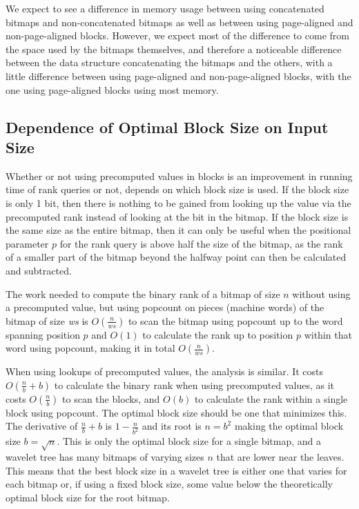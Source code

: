We expect to see a difference in memory usage between using concatenated bitmaps and non-concatenated bitmaps as well as between using page-aligned and non-page-aligned blocks.
However, we expect most of the difference to come from the space used by the bitmaps themselves, and therefore a noticeable difference between the data structure concatenating the bitmaps and the others, with a little difference between using page-aligned and non-page-aligned blocks, with the one using page-aligned blocks using most memory.


\subsection{Dependence of Optimal Block Size on Input Size}
\label{sec:bDependOnN}
Whether or not using precomputed values in blocks is an improvement in running time of rank queries or not, depends on which block size is used.
If the block size is only 1 bit, then there is nothing to be gained from looking up the value via the precomputed rank instead of looking at the bit in the bitmap.
If the block size is the same size as the entire bitmap, then it can only be useful when the positional parameter $p$ for the rank query is above half the size of the bitmap, as the rank of a smaller part of the bitmap beyond the halfway point can then be calculated and subtracted.

The work needed to compute the binary rank of a bitmap of size $n$ without using a precomputed value, but using popcount on pieces (machine words) of the bitmap of size \textit{ws} is $O(\frac{n}{\mathit{ws}})$ to scan the bitmap using popcount up to the word spanning position $p$ and $O(1)$ to calculate the rank up to position $p$ within that word using popcount, making it in total $O(\frac{n}{\mathit{ws}})$.

When using lookups of precomputed values, the analysis is similar.
It costs $O(\frac{n}{b} + b)$ to calculate the binary rank when using precomputed values, as it costs $O(\frac{n}{b})$ to scan the blocks, and $O(b)$ to calculate the rank within a single block using popcount.
The optimal block size should be one that minimizes this.
The derivative of $\frac{n}{b}+b$ is $1-\frac{n}{b^2}$ and its root is $n = b^2$ making the optimal block size $b = \sqrt{n}$.
This is only the optimal block size for a single bitmap, and a wavelet tree has many bitmaps of varying sizes $n$ that are lower near the leaves.
This means that the best block size in a wavelet tree is either one that varies for each bitmap or, if using a fixed block size, some value below the theoretically optimal block size for the root bitmap.

